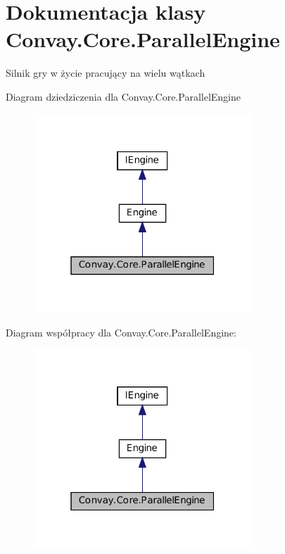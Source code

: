 \hypertarget{class_convay_1_1_core_1_1_parallel_engine}{}\section{Dokumentacja klasy Convay.\+Core.\+Parallel\+Engine}
\label{class_convay_1_1_core_1_1_parallel_engine}


Silnik gry w życie pracujący na wielu wątkach  




Diagram dziedziczenia dla Convay.\+Core.\+Parallel\+Engine
\nopagebreak
\begin{figure}[H]
\begin{center}
\leavevmode
\includegraphics[width=232pt]{class_convay_1_1_core_1_1_parallel_engine__inherit__graph}
\end{center}
\end{figure}


Diagram współpracy dla Convay.\+Core.\+Parallel\+Engine\+:
\nopagebreak
\begin{figure}[H]
\begin{center}
\leavevmode
\includegraphics[width=232pt]{class_convay_1_1_core_1_1_parallel_engine__coll__graph}
\end{center}
\end{figure}
